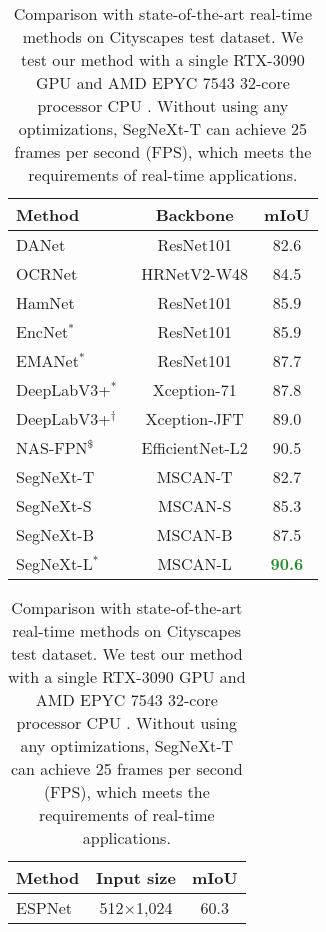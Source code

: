\documentclass{article}
\begin{document}
\begin{table}[t]
  \footnotesize
  \begin{minipage}{0.48 \textwidth}
  \centering
  \setlength{\tabcolsep}{2mm}
  \caption{Comparison with state-of-the-art methods on Pascal VOC dataset. $^{*}$ means COCO~\cite{lin2014microsoft} pretraining.
  $^{\dagger}$ denotes JFT-300M~\cite{sun2017revisiting} pretraining.
  $^{\$}$ utilizes additional 300M unlabeled images for pretraining.
  }
  \begin{tabular}{l|c|c}
    \toprule
	Method & Backbone & mIoU  \\
    \midrule
	DANet~\cite{fu2019dual} & ResNet101 & 82.6  \\ 
OCRNet~\cite{yuan2020object} & HRNetV2-W48 & 84.5  \\ 
	HamNet~\cite{geng2021attention} & ResNet101 & 85.9  \\
	EncNet$^{*}$~\cite{zhang2018context} & ResNet101 & 85.9 \\
	EMANet$^{*}$~\cite{li2019expectation} & ResNet101 & 87.7 \\
	DeepLabV3+$^{*}$~\cite{chen2018encoder} & Xception-71 & 87.8 \\
	DeepLabV3+$^{\dagger}$~\cite{chen2018encoder} & Xception-JFT & 89.0 \\
    NAS-FPN$^{\$}$~\cite{zoph2020rethinking} & EfficientNet-L2 & 90.5 \\
	\midrule
	SegNeXt-T & MSCAN-T & 82.7  \\ 
	SegNeXt-S & MSCAN-S & 85.3 \\ 
	SegNeXt-B & MSCAN-B & 87.5 \\ 
SegNeXt-L$^{*}$ & MSCAN-L & \textbf{\textcolor{ForestGreen}{90.6}} \\ 
    \bottomrule
  \end{tabular}
  \label{Tab.pascal_voc}
  \end{minipage}
  \hfill
\begin{minipage}{0.48\textwidth}
  \centering
  \setlength{\tabcolsep}{3.5mm}
\caption{
Comparison with state-of-the-art real-time methods on Cityscapes test dataset.
We test our method with a single RTX-3090 GPU and AMD EPYC 7543 32-core processor CPU .
Without using any optimizations, SegNeXt-T can achieve 25 frames per second (FPS),
which meets the requirements of real-time applications.
}
\begin{tabular}{l|c|c}
\toprule
	Method & Input size  & mIoU  \\
    \midrule
ESPNet~\cite{mehta2018espnet} & 512$\times$1,024 &  60.3  \\ 

\end{tabular}
\end{minipage}
\end{table}
\end{document}
